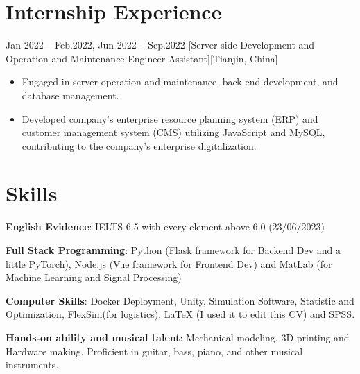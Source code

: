\documentclass{chicv}
\begin{document}
\section{Internship Experience}
%
%
  {Jan 2022 -- Feb.2022, Jun 2022 -- Sep.2022}
  [Server-side Development and Operation and Maintenance Engineer Assistant][Tianjin, China]
  \begin{itemize}
    \item Engaged in server operation and maintenance, back-end development, and database management. 
    \item Developed company's enterprise resource planning system (ERP) and customer management system (CMS) utilizing JavaScript and MySQL, contributing to the company's enterprise digitalization.
  \end{itemize}
%
%
\section{Skills}

\begin{compactlist}
  \item \textbf{English Evidence}: IELTS 6.5 with every element above 6.0 (23/06/2023)
  \item \textbf{Full Stack Programming}: Python (Flask framework for Backend Dev and a little PyTorch), Node.js (Vue framework for Frontend Dev) and MatLab (for Machine Learning and Signal Processing)
  \item \textbf{Computer Skills}: Docker Deployment, Unity, Simulation Software, Statistic and Optimization, FlexSim(for logistics), LaTeX (I used it to edit this CV) and SPSS.
  \item \textbf{Hands-on ability and musical talent}: Mechanical modeling, 3D printing and Hardware making. Proficient in guitar, bass, piano, and other musical instruments.

\end{compactlist}
%
%

%
%
\end{document}
